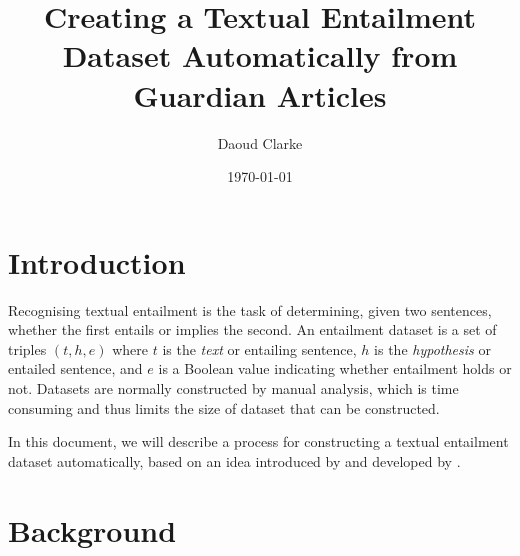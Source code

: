 \documentclass[twocolumn]{article}
\title{Creating a Textual Entailment Dataset Automatically from Guardian Articles}
\author{Daoud Clarke}
\date{\today}
\begin{document}
\maketitle

\section{Introduction}

Recognising textual entailment is the task of determining, given two
sentences, whether the first entails or implies the second. An
entailment dataset is a set of triples $(t,h,e)$ where $t$ is the
\emph{text} or entailing sentence, $h$ is the \emph{hypothesis} or
entailed sentence, and $e$ is a Boolean value indicating whether
entailment holds or not. Datasets are normally constructed by manual
analysis, which is time consuming and thus limits the size of dataset
that can be constructed.

In this document, we will describe a process for constructing a
textual entailment dataset automatically, based on an idea introduced
by \cite{Burger:05} and developed by \cite{Hickl:06}.

\section{Background}





\end{document}
